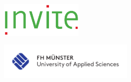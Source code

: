 \thispagestyle{empty}
\vspace*{-2cm} %
\setlength{\unitlength}{1cm}
\hfill
\begin{minipage}[t]{4cm} 
    \begin{center}
       \includegraphics[width=40mm]{bilder/Firmenlogo.png}
    \end{center}
\end{minipage}
 \hfill  %
 \begin{minipage}[t]{7cm}
    \begin{flushright}
       \includegraphics[width=66mm]{bilder/fhm_Logo_CMYK_30mm.pdf}
    \end{flushright}
 \end{minipage}

